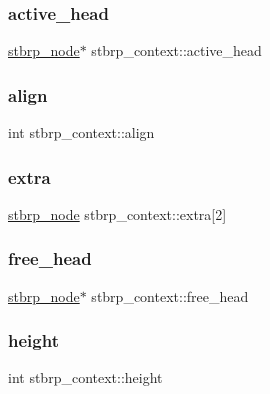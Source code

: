 \subsubsection{\texorpdfstring{active\+\_\+head}{active\_head}}
{\footnotesize\ttfamily \hyperlink{structstbrp__node}{stbrp\+\_\+node}$\ast$ stbrp\+\_\+context\+::active\+\_\+head}

\hypertarget{structstbrp__context_ae36053e2001a725aec2b5756dc990481}{}\label{structstbrp__context_ae36053e2001a725aec2b5756dc990481} 
\subsubsection{\texorpdfstring{align}{align}}
{\footnotesize\ttfamily int stbrp\+\_\+context\+::align}

\hypertarget{structstbrp__context_a0b80e1fbdac125427526f3500d4e7624}{}\label{structstbrp__context_a0b80e1fbdac125427526f3500d4e7624} 
\subsubsection{\texorpdfstring{extra}{extra}}
{\footnotesize\ttfamily \hyperlink{structstbrp__node}{stbrp\+\_\+node} stbrp\+\_\+context\+::extra\mbox{[}2\mbox{]}}

\hypertarget{structstbrp__context_a1336ae32373663847866cc65904c2839}{}\label{structstbrp__context_a1336ae32373663847866cc65904c2839} 
\subsubsection{\texorpdfstring{free\+\_\+head}{free\_head}}
{\footnotesize\ttfamily \hyperlink{structstbrp__node}{stbrp\+\_\+node}$\ast$ stbrp\+\_\+context\+::free\+\_\+head}

\hypertarget{structstbrp__context_af3715a6f3faecfb4fac8f6ccbb71f9c7}{}\label{structstbrp__context_af3715a6f3faecfb4fac8f6ccbb71f9c7} 
\subsubsection{\texorpdfstring{height}{height}}
{\footnotesize\ttfamily int stbrp\+\_\+context\+::height}

